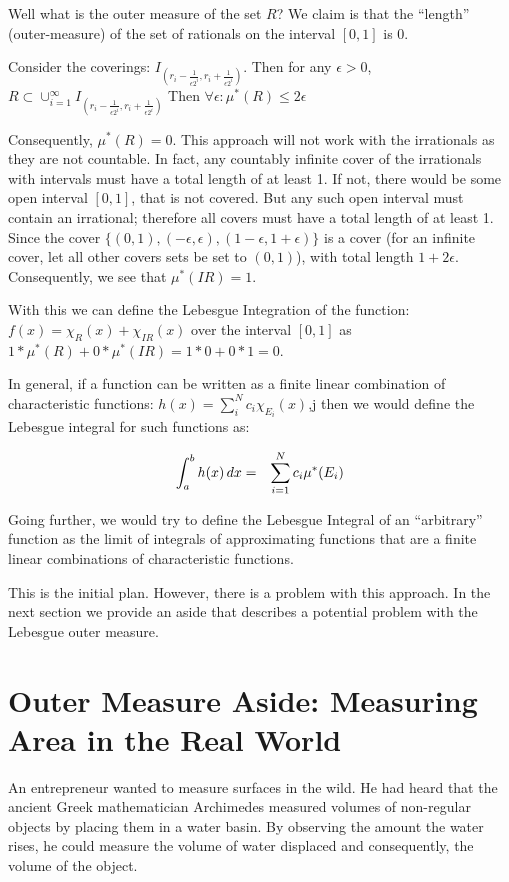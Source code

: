 \documentclass{article}
\begin{document}
Well what is the outer measure of the set $R$? We claim is that the ``length'' 
(outer-measure) of the set of rationals on the interval $[0,1]$ is $0$.

Consider the coverings: $I_(r_i - \frac{1}{\epsilon 2^i}, r_i + \frac{1}{\epsilon 2^i})$. 
Then for any
$\epsilon > 0$, $R \subset \cup_{i=1}^\infty I_(r_i - \frac{1}{\epsilon 2^i}, r_i + \frac{1}{\epsilon 2^i})$
Then $\forall \epsilon: \mu^*(R) \le 2 \epsilon$

Consequently, $\mu^*(R) = 0$. This approach will not work with the irrationals 
as they are not countable. In fact, any countably infinite cover of the 
irrationals with intervals must have a total length of at least 1. 
If not, there would be some open interval  $[0,1]$, that is not covered. 
But any such open 
interval must contain an irrational; therefore all covers must have a total length 
of at least 1. Since the cover $\{(0,1), (-\epsilon, \epsilon), (1 - \epsilon,1 + \epsilon)\}$
is a cover (for an infinite cover, let all other covers sets be set 
to $(0,1)$), with total length $1 + 2 \epsilon$.
Consequently, we see that $\mu^*(IR) = 1$.

With this we can define the Lebesgue Integration of the function: 
$f(x) = \chi_{R}(x) + \chi_{IR}(x)$ over the interval $[0,1]$ 
as $1 * \mu^*(R) + 0 * \mu^*(IR) = 1 * 0 + 0 * 1 = 0$.

In general, if a function can be written as a finite linear combination of 
characteristic functions: $h(x) = \sum_i^N c_i \chi_{E_i}(x)$,j
then we would define the Lebesgue integral for such functions as:

\begin{eqnarray}
	\int_a^b h(x) \, dx & = & \sum_{i=1}^N\limits c_i \mu^*(E_i)
\end{eqnarray}

Going further, we would try to define the Lebesgue Integral of an ``arbitrary''
function as the limit of integrals of approximating functions that
are a finite linear combinations of characteristic functions.

This is the initial plan. However, there is a problem with this approach. In the next section we 
provide an aside that describes a potential problem with the Lebesgue outer measure.


\section{Outer Measure Aside: Measuring Area in the Real World}
An entrepreneur 
wanted to measure surfaces in the wild. He had heard that the 
ancient Greek mathematician Archimedes measured volumes of non-regular objects 
by placing them in a water basin. By observing the amount the water rises, he 
could measure the volume of water displaced and consequently, the volume of the object.
\end{document}
